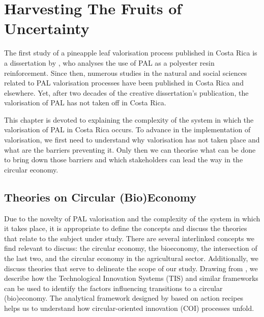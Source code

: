 \chapter{Harvesting The Fruits of Uncertainty}
\label{chapter_3lab}

The first study of a pineapple leaf valorisation process published in Costa Rica is a dissertation by \cite{quesada2003utilizacion}, who analyses the use of PAL as a polyester resin reinforcement. Since then, numerous studies in the natural and social sciences related to PAL valorisation processes have been published in Costa Rica and elsewhere. Yet, after two decades of the creative dissertation's publication, the valorisation of PAL has not taken off in Costa Rica. 

This chapter is devoted to explaining the complexity of the system in which the valorisation of PAL in Costa Rica occurs. To advance in the implementation of valorisation, we first need to understand why valorisation has not taken place and what are the barriers preventing it. Only then we can theorise what can be done to bring down those barriers and which stakeholders can lead the way in the circular economy.

\section{Theories on Circular (Bio)Economy}
\label{theoryframe}

 Due to the novelty of PAL valorisation and the complexity of the system in which it takes place, it is appropriate to define the concepts and discuss the theories that relate to the subject under study. There are several interlinked concepts we find relevant to discuss: the circular economy, the bioeconomy, the intersection of the last two, and the circular economy in the agricultural sector. Additionally, we discuss theories that serve to delineate the scope of our study.  Drawing from \cite{gottinger2020studying}, we describe how the Technological Innovation Systems (TIS) and similar frameworks can be used to identify the factors influencing transitions to a circular (bio)economy. The analytical framework designed by \cite{blomsma2022making} based on action recipes helps us to understand how circular-oriented innovation (COI) processes unfold.

